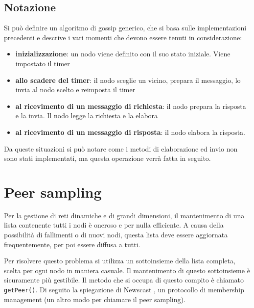 \subsection{Notazione}

Si può definire un algoritmo di gossip generico, che si basa sulle implementazioni precedenti e descrive i vari momenti che devono essere tenuti in considerazione:
\begin{itemize}
    \item \textbf{inizializzazione}: un nodo viene definito con il suo stato iniziale. Viene impostato il timer
    \item \textbf{allo scadere del timer}: il nodo sceglie un vicino, prepara il messaggio, lo invia al nodo scelto e reimposta il timer
    \item \textbf{al ricevimento di un messaggio di richiesta}: il nodo prepara la risposta e la invia. Il nodo legge la richiesta e la elabora
    \item \textbf{al ricevimento di un messaggio di risposta}: il nodo elabora la risposta.
\end{itemize}

Da queste situazioni si può notare come i metodi di elaborazione ed invio non sono stati implementati, ma questa operazione verrà fatta in seguito. 

\section{Peer sampling}

Per la gestione di reti dinamiche e di grandi dimensioni, il mantenimento di una lista contenente tutti i nodi è oneroso e per nulla efficiente. A causa della possibilità di fallimenti o di nuovi nodi, questa lista deve essere aggiornata frequentemente, per poi essere diffusa a tutti. 

Per risolvere questo problema si utilizza un sottoinsieme della lista completa, scelta per ogni nodo in maniera casuale. Il mantenimento di questo sottoinsieme è sicuramente più gestibile. 
Il metodo che si occupa di questo compito è chiamato \texttt{getPeer()}.
Di seguito la spiegazione di Newscast \cite{newscast}, un protocollo di membership management (un altro modo per chiamare il peer sampling).

